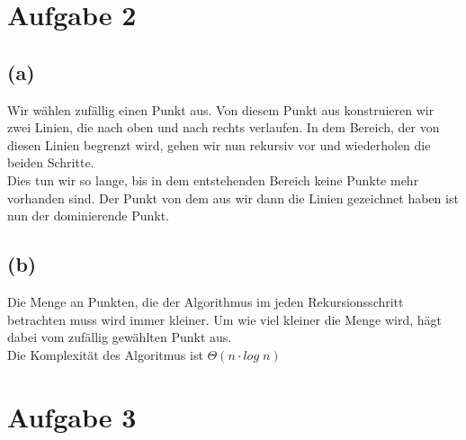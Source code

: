 \documentclass[a4paper]{scrartcl}
\begin{document}
\section*{Aufgabe 2}
\subsection*{(a)} %
Wir wählen zufällig einen Punkt aus. Von diesem Punkt aus konstruieren wir zwei Linien, die nach oben und nach rechts verlaufen. In dem Bereich, der von diesen Linien begrenzt wird, gehen wir nun rekursiv vor und wiederholen die beiden Schritte.\\
Dies tun wir so lange, bis in dem entstehenden Bereich keine Punkte mehr vorhanden sind. Der Punkt von dem aus wir dann die Linien gezeichnet haben ist nun der dominierende Punkt.


\subsection*{(b)}
Die Menge an Punkten, die der Algorithmus im jeden Rekursionsschritt betrachten muss wird immer kleiner. Um wie viel kleiner die Menge wird, hägt dabei vom zufällig gewählten Punkt aus.\\
Die Komplexität des Algoritmus ist $\Theta (n \cdot log \; n)$









\section*{Aufgabe 3}
\end{document}
